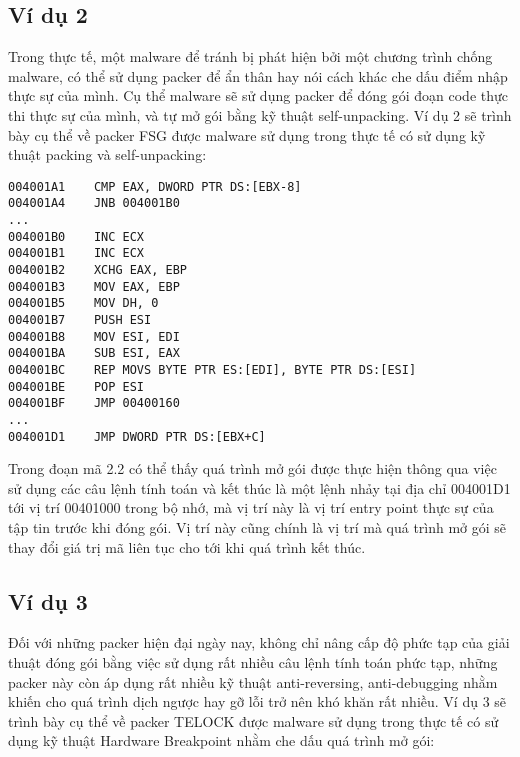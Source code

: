\subsection{Ví dụ 2}

\hspace{0.5cm}Trong thực tế, một malware để tránh bị phát hiện bởi một chương trình chống malware, có thể sử dụng packer để ẩn thân hay nói cách khác che dấu điểm nhập thực sự của mình. Cụ thể malware sẽ sử dụng packer để đóng gói đoạn code thực thi thực sự của mình, và tự mở gói bằng kỹ thuật self-unpacking. Ví dụ 2 sẽ trình bày cụ thể về packer FSG được malware sử dụng trong thực tế có sử dụng kỹ thuật packing và self-unpacking:

\begin{code}
\begin{lstlisting}[captionpos=b,caption={Kỹ thuật Unpacking sử dụng trong packer FSG},frame=single]
004001A1	CMP EAX, DWORD PTR DS:[EBX-8]
004001A4	JNB 004001B0
...
004001B0	INC ECX
004001B1	INC ECX
004001B2	XCHG EAX, EBP
004001B3	MOV EAX, EBP
004001B5	MOV DH, 0
004001B7	PUSH ESI
004001B8	MOV ESI, EDI
004001BA	SUB ESI, EAX
004001BC	REP MOVS BYTE PTR ES:[EDI], BYTE PTR DS:[ESI]
004001BE	POP ESI
004001BF 	JMP 00400160		
...
004001D1	JMP DWORD PTR DS:[EBX+C]
\end{lstlisting}
\end{code} 

\hspace{0.5cm}Trong đoạn mã 2.2 có thể thấy quá trình mở gói được thực hiện thông qua việc sử dụng các câu lệnh tính toán và kết thúc là một lệnh nhảy tại địa chỉ 004001D1 tới vị trí 00401000 trong bộ nhớ, mà vị trí này là vị trí entry point thực sự của tập tin trước khi đóng gói. Vị trí này cũng chính là vị trí mà quá trình mở gói sẽ thay đổi giá trị mã liên tục cho tới khi quá trình kết thúc. 

\subsection{Ví dụ 3}

\hspace{0.5cm}Đối với những packer hiện đại ngày nay, không chỉ nâng cấp độ phức tạp của giải thuật đóng gói bằng việc sử dụng rất nhiều câu lệnh tính toán phức tạp, những packer này còn áp dụng rất nhiều kỹ thuật anti-reversing, anti-debugging nhằm khiến cho quá trình dịch ngược hay gỡ lỗi trở nên khó khăn rất nhiều. Ví dụ 3 sẽ trình bày cụ thể về packer TELOCK được malware sử dụng trong thực tế có sử dụng kỹ thuật Hardware Breakpoint nhằm che dấu quá trình mở gói:

